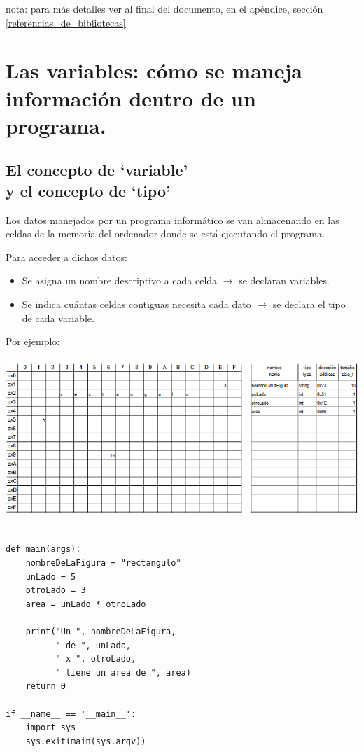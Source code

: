 \documentclass[spanish,12pt,a4paper,final,oneside]{book}
\begin{document}
nota: para más detalles ver al final del documento, en el apéndice, sección  \ref{referencias_de_bibliotecas}


\newpage
\chapter{Las variables: cómo se maneja información dentro de un programa.}

\section{El concepto de `variable' \\ y el concepto de `tipo'}

Los datos manejados por un programa informático se van almacenando en las celdas de la memoria del ordenador donde se está ejecutando el programa.

Para acceder a dichos datos:
\begin{itemize}
\item Se asigna un nombre descriptivo a cada celda $\rightarrow$ se declaran variables. 
\item Se indica cuántas celdas contiguas necesita cada dato  $\rightarrow$ se declara el tipo de cada variable.
\end{itemize}

Por ejemplo:

\includegraphics[width=\textwidth]{variables vs celdas de memoria}

\begin{lstlisting}[frame=single, caption=lenguaje Python]

def main(args):
    nombreDeLaFigura = "rectangulo"
    unLado = 5
    otroLado = 3
    area = unLado * otroLado
    
    print("Un ", nombreDeLaFigura, 
          " de ", unLado, 
          " x ", otroLado, 
          " tiene un area de ", area) 
    return 0

if __name__ == '__main__':
    import sys
    sys.exit(main(sys.argv))
    
\end{lstlisting}
\end{document}
